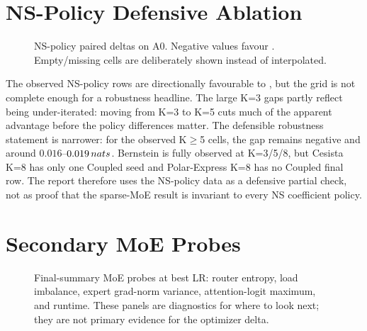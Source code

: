 \documentclass[11pt,a4paper]{article}
\begin{document}
\section{NS-Policy Defensive Ablation}

\begin{figure}[h]
\centering
{}
\caption{NS-policy paired deltas on A0. Negative values favour \optCoupled{}. Empty/missing cells are deliberately shown instead of interpolated.}\label{fig:part2-ns-policy}
\end{figure}

\begin{table}[h]
\centering
{}
\caption{NS-policy final-loss table. The full $\{\text{Bernstein},\text{Cesista},\text{Polar-Express}\}\times K{=}\{3,5,8\}$ robustness claim is not yet available: Polar-Express K=8 has no Coupled final row, and Cesista K=8 has only one paired seed.}\label{tab:part2-ns-policy}
\end{table}

The observed NS-policy rows are directionally favourable to \optCoupled{}, but the grid is not complete enough for a robustness headline. The large K=3 gaps partly reflect \optMuon{} being under-iterated: moving \optMuon{} from K=3 to K=5 cuts much of the apparent advantage before the policy differences matter. The defensible robustness statement is narrower: for the observed K$\geq$5 cells, the gap remains negative and around $0.016$--$0.019\,nats{}$. Bernstein is fully observed at K=3/5/8, but Cesista K=8 has only one Coupled seed and Polar-Express K=8 has no Coupled final row. The report therefore uses the NS-policy data as a defensive partial check, not as proof that the sparse-MoE result is invariant to every NS coefficient policy.

\section{Secondary MoE Probes}

\begin{figure}[h]
\centering
{}
\caption{Final-summary MoE probes at best LR: router entropy, load imbalance, expert grad-norm variance, attention-logit maximum, and runtime. These panels are diagnostics for where to look next; they are not primary evidence for the optimizer delta.}\label{fig:part2-moe-probes}
\end{figure}
\end{document}
